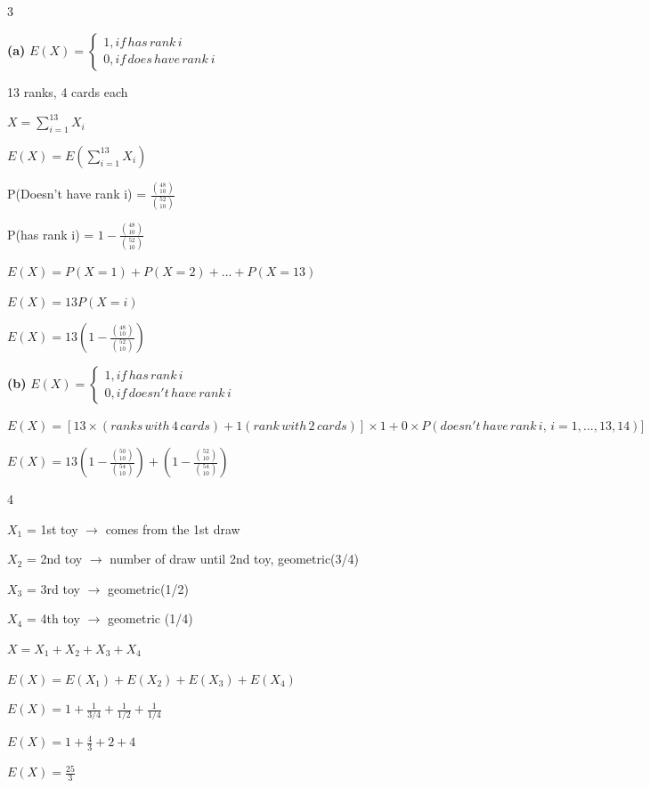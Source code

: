 \documentclass[12 pt]{article}
\begin{document}
    \begin{exercise}{3}
    \hfill

    \textbf{(a)}
    $E(X) = \begin{cases}
        1, if \, has \, rank \, i \\
        0, if \, does \, have \, rank \ i
    \end{cases}$

    13 ranks, 4 cards each

    $X = \sum_{i=1}^{13} X_i$

    $E(X) = E(\sum_{i=1}^{13} X_i)$

    P(Doesn't have rank i) = $\frac{\binom{48}{10}}{\binom{52}{10}}$

    P(has rank i) = $1 - \frac{\binom{48}{10}}{\binom{52}{10}}$

    $E(X) = P(X=1) + P(X=2) + ... + P(X=13)$

    $E(X) = 13 P(X=i)$

    $E(X) = 13 (1 - \frac{\binom{48}{10}}{\binom{52}{10}})$

    \hfill

    \textbf{(b)}
    $E(X) = \begin{cases}
        1, if \, has \, rank \, i \\
        0, if \, doesn't \, have \, rank \, i
    \end{cases}$

    $E(X) = [13 \times (ranks \, with \, 4 \, cards) + 1(rank \, with \, 2 \, cards)] \times 1 + 0 \times P(doesn't \, have \, rank \, i, \, i= 1, ..., 13, 14)]$

    $E(X) = 13(1 - \frac{\binom{50}{10}}{\binom{54}{10}}) + (1 - \frac{\binom{52}{10}}{\binom{54}{10}})$

    \hfill    
    \end{exercise}


    \begin{exercise}{4}
    \hfill

    $X_1$ = 1st toy $\xrightarrow{}$ comes from the 1st draw

    $X_2$ = 2nd toy $\xrightarrow{}$ number of draw until 2nd toy, geometric(3/4)

    $X_3$ = 3rd toy $\xrightarrow{}$ geometric(1/2)

    $X_4$ = 4th toy $\xrightarrow{}$ geometric (1/4)

    \hfill

    $X = X_1 + X_2 + X_3 + X_4$

    $E(X) = E(X_1) + E(X_2) + E(X_3) + E(X_4)$

    $E(X) = 1 + \frac{1}{3/4} + \frac{1}{1/2} + \frac{1}{1/4}$

    $E(X) = 1 + \frac{4}{3} + 2 + 4$

    $E(X) = \frac{25}{3}$

    \hfill    
    \end{exercise}
\end{document}
